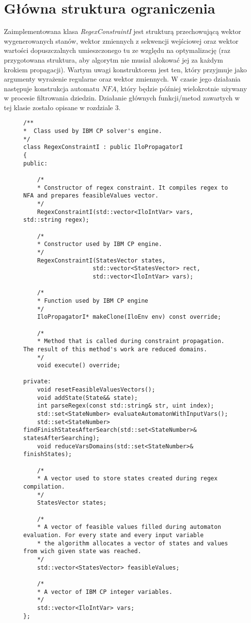 \section{Główna struktura ograniczenia}
\par
Zaimplementowana klasa \textit{RegexConstraintI} jest strukturą przechowującą wektor wygenerowanych stanów,
wektor zmiennych z sekwencji wejściowej oraz wektor wartości dopuszczalnych umieszczonego tu ze względu
na optymalizację (raz przygotowana struktura, aby algorytm nie musiał alokować jej za każdym krokiem propagacji).
Wartym uwagi konstruktorem jest ten, który przyjmuje jako argumenty wyrażenie regularne oraz wektor zmiennych. W czasie jego
działania następuje konstrukcja automatu $NFA$, który będzie później wielokrotnie używany w procesie filtrowania dziedzin.
Działanie głównych funkcji/metod zawartych w tej klasie zostało opisane w rozdziale 3.

\begin{figure}
\begin{lstlisting}[caption=Główna klasa zawierająca implementację ograniczenia \textit{RegexConstraint}., style=customc]
/**
*  Class used by IBM CP solver's engine.
*/
class RegexConstraintI : public IloPropagatorI
{
public:

    /*
    * Constructor of regex constraint. It compiles regex to NFA and prepares feasibleValues vector.
    */
    RegexConstraintI(std::vector<IloIntVar> vars, std::string regex);

    /*
    * Constructor used by IBM CP engine.
    */
    RegexConstraintI(StatesVector states,
                    std::vector<StatesVector> rect,
                    std::vector<IloIntVar> vars);

    /*
    * Function used by IBM CP engine
    */
    IloPropagatorI* makeClone(IloEnv env) const override;

    /*
    * Method that is called during constraint propagation. The result of this method's work are reduced domains.
    */
    void execute() override;

private:
    void resetFeasibleValuesVectors();
    void addState(State&& state);
    int parseRegex(const std::string& str, uint index);
    std::set<StateNumber> evaluateAutomatonWithInputVars();
    std::set<StateNumber> findFinishStatesAfterSearch(std::set<StateNumber>& statesAfterSearching);
    void reduceVarsDomains(std::set<StateNumber>& finishStates);

    /*
    * A vector used to store states created during regex compilation.
    */
    StatesVector states;

    /*
    * A vector of feasible values filled during automaton evaluation. For every state and every input variable
    * the algorithm allocates a vector of states and values from wich given state was reached.
    */
    std::vector<StatesVector> feasibleValues;

    /*
    * A vector of IBM CP integer variables.
    */
    std::vector<IloIntVar> vars;
};
\end{lstlisting}
\end{figure}


